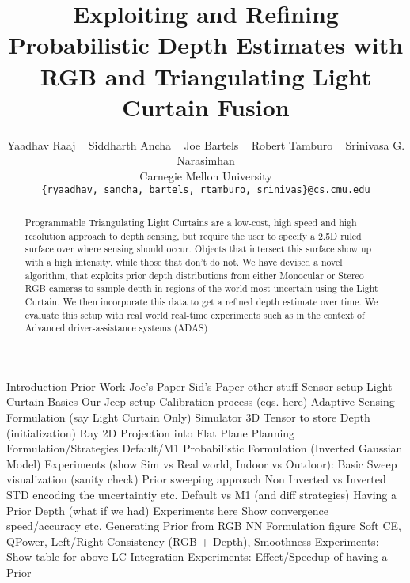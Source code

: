 \documentclass[review]{cvpr}
\begin{document}
\title{Exploiting and Refining Probabilistic Depth Estimates with RGB and Triangulating Light Curtain Fusion}

\author{Yaadhav Raaj ~ Siddharth Ancha ~ Joe Bartels ~ Robert Tamburo ~ Srinivasa G. Narasimhan\\
Carnegie Mellon University\\
{\tt\small \{ryaadhav, sancha, bartels, rtamburo, srinivas\}@cs.cmu.edu}
}

\maketitle

\begin{abstract}
Programmable Triangulating Light Curtains are a low-cost, high speed and high resolution approach to depth sensing, but require the user to specify a 2.5D ruled surface over where sensing should occur. Objects that intersect this surface show up with a high intensity, while those that don't do not. We have devised a novel algorithm, that exploits prior depth distributions from either Monocular or Stereo RGB cameras to sample depth in regions of the world most uncertain using the Light Curtain. We then incorporate this data to get a refined depth estimate over time. We evaluate this setup with real world real-time experiments such as in the context of Advanced driver-assistance systems (ADAS)
\end{abstract}

\iffalse
Introduction
Prior Work
   Joe's Paper
   Sid's Paper
   other stuff
Sensor setup
   Light Curtain Basics
   Our Jeep setup
   Calibration process (eqs. here)
Adaptive Sensing Formulation (say Light Curtain Only)
   Simulator
   3D Tensor to store Depth (initialization)
   Ray 2D Projection into Flat Plane
   Planning Formulation/Strategies Default/M1
   Probabilistic Formulation (Inverted Gaussian Model)
   Experiments (show Sim vs Real world, Indoor vs Outdoor):
      Basic Sweep visualization (sanity check)
      Prior sweeping approach
      Non Inverted vs Inverted
      STD encoding the uncertaintiy etc.
      Default vs M1 (and diff strategies)
   Having a Prior Depth (what if we had)
   Experiments here
         Show convergence speed/accuracy etc.
Generating Prior from RGB
   NN Formulation figure
   Soft CE, QPower, Left/Right Consistency (RGB + Depth), Smoothness
   Experiments:
      Show table for above
   LC Integration
   Experiments:
      Effect/Speedup of having a Prior
      
\end{document}
